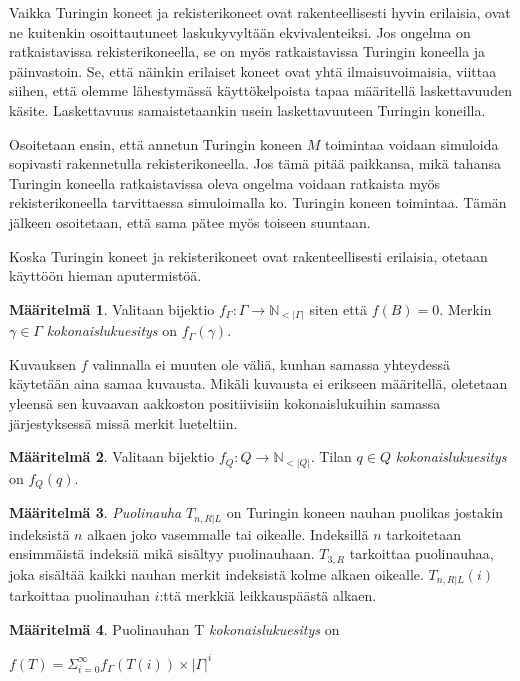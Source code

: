 \documentclass[a4paper, 12pt]{article}
\theoremstyle{definition}
\newtheorem{mydef}{Määritelmä}
\theoremstyle{plain}
\begin{document}
Vaikka Turingin koneet ja rekisterikoneet ovat rakenteellisesti hyvin erilaisia, ovat ne kuitenkin osoittautuneet laskukyvyltään ekvivalenteiksi. Jos ongelma on ratkaistavissa rekisterikoneella, se on myös ratkaistavissa Turingin koneella ja päinvastoin. Se, että näinkin erilaiset koneet ovat yhtä ilmaisuvoimaisia, viittaa siihen, että olemme lähestymässä käyttökelpoista tapaa määritellä laskettavuuden käsite. Laskettavuus samaistetaankin usein laskettavuuteen Turingin koneilla.

Osoitetaan ensin, että annetun Turingin koneen $M$ toimintaa voidaan simuloida sopivasti rakennetulla rekisterikoneella. Jos tämä pitää paikkansa, mikä tahansa Turingin koneella ratkaistavissa oleva ongelma voidaan ratkaista myös rekisterikoneella tarvittaessa simuloimalla ko. Turingin koneen toimintaa. Tämän jälkeen osoitetaan, että sama pätee myös toiseen suuntaan.

Koska Turingin koneet ja rekisterikoneet ovat rakenteellisesti erilaisia, otetaan käyttöön hieman aputermistöä.

\begin{mydef}
Valitaan bijektio $f_\Gamma : \Gamma \rightarrow \mathbb{N}_{<|\Gamma|}$ siten että $f(B) = 0$. Merkin $\gamma \in \Gamma$ \emph{kokonaislukuesitys} on $f_\Gamma(\gamma)$.
\end{mydef}
Kuvauksen $f$ valinnalla ei muuten ole väliä, kunhan samassa yhteydessä käytetään aina samaa kuvausta. Mikäli kuvausta ei erikseen määritellä, oletetaan yleensä sen kuvaavan aakkoston positiivisiin kokonaislukuihin samassa järjestyksessä missä merkit lueteltiin.

\begin{mydef}
Valitaan bijektio $f_Q : Q \rightarrow \mathbb{N}_{<|Q|}$. Tilan $q \in Q$ \emph{kokonaislukuesitys} on $f_Q(q)$.
\end{mydef}

\begin{mydef}
\emph{Puolinauha} $T_{n, R | L}$ on Turingin koneen nauhan puolikas jostakin indeksistä $n$ alkaen joko vasemmalle tai oikealle. Indeksillä $n$ tarkoitetaan ensimmäistä indeksiä mikä sisältyy puolinauhaan. $T_{3, R}$ tarkoittaa puolinauhaa, joka sisältää kaikki nauhan merkit indeksistä kolme alkaen oikealle. $T_{n, R | L}(i)$ tarkoittaa puolinauhan $i$:ttä merkkiä leikkauspäästä alkaen.
\end{mydef}

\begin{mydef}
Puolinauhan T \emph{kokonaislukuesitys} on 
\begin{center}
\begin{math}
f(T) = \Sigma_{i=0}^{\infty} f_\Gamma(T(i)) \times |\Gamma|^i
\end{math}
\end{center}
\end{mydef}
\end{document}
